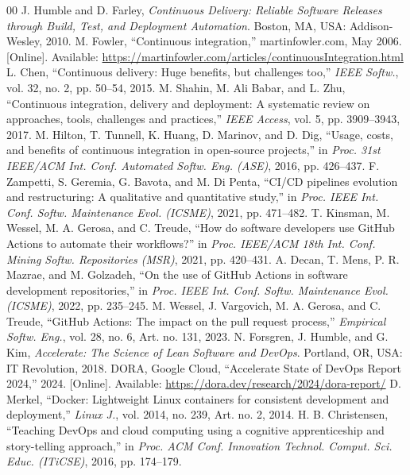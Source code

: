 \documentclass[conference]{IEEEtran}
\begin{document}
\begin{thebibliography}{00}
 J. Humble and D. Farley, \textit{Continuous Delivery: Reliable Software Releases through Build, Test, and Deployment Automation}. Boston, MA, USA: Addison-Wesley, 2010.
 M. Fowler, ``Continuous integration,'' martinfowler.com, May 2006. [Online]. Available: \url{https://martinfowler.com/articles/continuousIntegration.html}
 L. Chen, ``Continuous delivery: Huge benefits, but challenges too,'' \textit{IEEE Softw.}, vol. 32, no. 2, pp. 50--54, 2015.
 M. Shahin, M. Ali Babar, and L. Zhu, ``Continuous integration, delivery and deployment: A systematic review on approaches, tools, challenges and practices,'' \textit{IEEE Access}, vol. 5, pp. 3909--3943, 2017.
 M. Hilton, T. Tunnell, K. Huang, D. Marinov, and D. Dig, ``Usage, costs, and benefits of continuous integration in open-source projects,'' in \textit{Proc. 31st IEEE/ACM Int. Conf. Automated Softw. Eng. (ASE)}, 2016, pp. 426--437.
 F. Zampetti, S. Geremia, G. Bavota, and M. Di Penta, ``CI/CD pipelines evolution and restructuring: A qualitative and quantitative study,'' in \textit{Proc. IEEE Int. Conf. Softw. Maintenance Evol. (ICSME)}, 2021, pp. 471--482. %
 T. Kinsman, M. Wessel, M. A. Gerosa, and C. Treude, ``How do software developers use GitHub Actions to automate their workflows?'' in \textit{Proc. IEEE/ACM 18th Int. Conf. Mining Softw. Repositories (MSR)}, 2021, pp. 420--431.
 A. Decan, T. Mens, P. R. Mazrae, and M. Golzadeh, ``On the use of GitHub Actions in software development repositories,'' in \textit{Proc. IEEE Int. Conf. Softw. Maintenance Evol. (ICSME)}, 2022, pp. 235--245. %
 M. Wessel, J. Vargovich, M. A. Gerosa, and C. Treude, ``GitHub Actions: The impact on the pull request process,'' \textit{Empirical Softw. Eng.}, vol. 28, no. 6, Art. no. 131, 2023. %
 N. Forsgren, J. Humble, and G. Kim, \textit{Accelerate: The Science of Lean Software and DevOps}. Portland, OR, USA: IT Revolution, 2018.
 DORA, Google Cloud, ``Accelerate State of DevOps Report 2024,'' 2024. [Online]. Available: \url{https://dora.dev/research/2024/dora-report/}
 D. Merkel, ``Docker: Lightweight Linux containers for consistent development and deployment,'' \textit{Linux J.}, vol. 2014, no. 239, Art. no. 2, 2014.
 H. B. Christensen, ``Teaching DevOps and cloud computing using a cognitive apprenticeship and story-telling approach,'' in \textit{Proc. ACM Conf. Innovation Technol. Comput. Sci. Educ. (ITiCSE)}, 2016, pp. 174--179.

\end{thebibliography}
\end{document}

